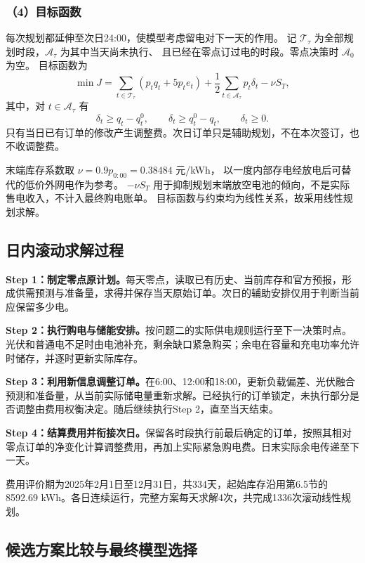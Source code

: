 \subsubsection*{（4）目标函数}

每次规划都延伸至次日24:00，使模型考虑留电对下一天的作用。
记 $\mathcal T_{\tau}$ 为全部规划时段，$\mathcal A_{\tau}$ 为其中当天尚未执行、
且已经在零点订过电的时段。零点决策时 $\mathcal A_0$ 为空。
目标函数为
\begin{equation}
\min J=\sum_{t\in\mathcal T_{\tau}}(p_tq_t+5p_te_t)
+\frac12\sum_{t\in\mathcal A_{\tau}}p_t\delta_t-\nu S_T,
\end{equation}
其中，对 $t\in\mathcal A_{\tau}$ 有
\begin{equation}
\delta_t\geq q_t-q_t^0,\qquad
\delta_t\geq q_t^0-q_t,\qquad\delta_t\geq0.
\end{equation}
只有当日已有订单的修改产生调整费。次日订单只是辅助规划，不在本次签订，也不收调整费。

末端库存系数取 $\nu=0.9p_{0:00}=0.38484$ 元/kWh，
以一度内部存电经放电后可替代的低价外网电作为参考。
$-\nu S_T$ 用于抑制规划末端放空电池的倾向，不是实际售电收入，不计入最终购电账单。
目标函数与约束均为线性关系，故采用线性规划求解。

\subsection{日内滚动求解过程}

\textbf{Step 1：制定零点原计划。}每天零点，读取已有历史、当前库存和官方预报，形成供需预测与准备量，求得并保存当天原始订单。次日的辅助安排仅用于判断当前应保留多少电。

\textbf{Step 2：执行购电与储能安排。}按问题二的实际供电规则运行至下一决策时点。光伏和普通电不足时由电池补充，剩余缺口紧急购买；余电在容量和充电功率允许时储存，并逐时更新实际库存。

\textbf{Step 3：利用新信息调整订单。}在6:00、12:00和18:00，更新负载偏差、光伏融合预测和准备量，从当前实际储电量重新求解。已经执行的订单锁定，未执行部分是否调整由费用权衡决定。随后继续执行Step 2，直至当天结束。

\textbf{Step 4：结算费用并衔接次日。}保留各时段执行前最后确定的订单，按照其相对零点订单的净变化计算调整费用，再加上实际紧急购电费。日末实际余电传递至下一天。

费用评价期为2025年2月1日至12月31日，共334天，起始库存沿用第6.5节的8592.69 kWh。各日连续运行，完整方案每天求解4次，共完成1336次滚动线性规划。

\subsection{候选方案比较与最终模型选择}

